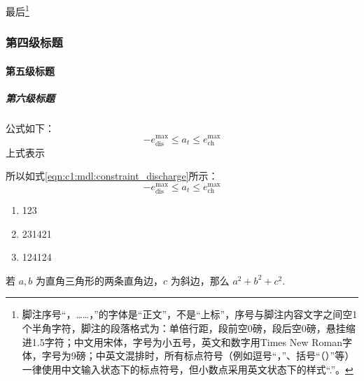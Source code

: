 

\zhlipsum[11]
最后\footnote{脚注序号“，……，”的字体是“正文”，不是“上标”，序号与脚注内容文字之间空1个半角字符，脚注的段落格式为：单倍行距，段前空0磅，段后空0磅，悬挂缩进1.5字符；中文用宋体，字号为小五号，英文和数字用Times New Roman字体，字号为9磅；中英文混排时，所有标点符号（例如逗号“，”、括号“（）”等）一律使用中文输入状态下的标点符号，但小数点采用英文状态下的样式“.”。}



\zhlipsum[12]



\subsubsection{第四级标题}

\paragraph{第五级标题}

\subparagraph{第六级标题}



公式如下：
\begin{equation}\label{eqn:c1:mdl:constraint_discharge}
    -e^{\max}_\text{dis} \leq a_t \leq e^{\max}_\text{ch}
\end{equation}
上式表示

所以如式\eqref{eqn:c1:mdl:constraint_discharge}所示：
\begin{equation}
    -e^{\max}_\text{dis} \leq a_t \leq e^{\max}_\text{ch}
\end{equation}

\begin{enumerate}
    \item 123
    \item 231421
    \item 124124
\end{enumerate}

\begin{theorem}[勾股定理]
    若 $a,b$ 为直角三角形的两条直角边，$c$ 为斜边，那么 $a^2 + b^2 + c^2.$
\end{theorem}

